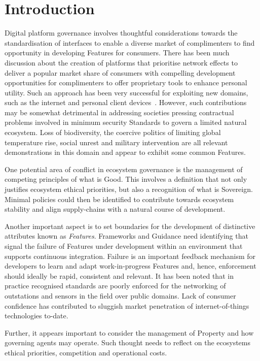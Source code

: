 \documentclass[11pt, oneside]{book}   	%
\begin{document}
\chapter{Introduction}
Digital platform governance involves thoughtful considerations towards the standardisation of interfaces to enable a diverse market of complimenters to find opportunity in developing Features for consumers.
There has been much discussion about the creation of platforms that prioritise network effects to deliver a popular market share of consumers with compelling development opportunities for complimenters to offer proprietary tools to enhance personal utility.
Such an approach has been very successful for exploiting new domains, such as the internet and personal client devices~\cite{bop1}.
However, such contributions may be somewhat detrimental in addressing societies pressing contractual problems involved in minimum security Standards to govern a limited natural ecosystem.
Loss of biodiversity, the coercive politics of limiting global temperature rise, social unrest and military intervention are all relevant demonstrations in this domain and appear to exhibit some common Features.\

One potential area of conflict in ecosystem governance is the management of competing principles of what is Good.
This involves a definition that not only justifies ecosystem ethical priorities, but also a recognition of what is Sovereign.
Minimal policies could then be identified to contribute towards ecosystem stability and align supply-chains with a natural course of development.\

Another important aspect is to set boundaries for the development of distinctive attributes known as \emph{Features}.
Frameworks and Guidance need identifying that signal the failure of Features under development within an environment that supports continuous integration.
Failure is an important feedback mechanism for developers to learn and adapt work-in-progress Features and, hence, enforcement should ideally be rapid, consistent and relevant.
It has been noted that in practice recognised standards are poorly enforced for the networking of outstations and sensors in the field over public domains.
Lack of consumer confidence has contributed to sluggish market penetration of internet-of-things technologies to-date.\

Further, it appears important to consider the management of Property and how governing agents may operate.
Such thought needs to reflect on the ecosystems ethical priorities, competition and operational costs.\
\end{document}
